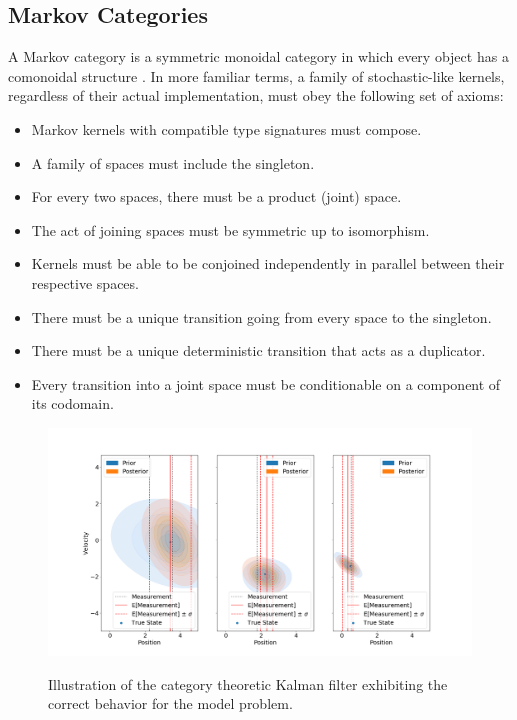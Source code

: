 \documentclass[letterpaper, 10 pt, conference]{ieeeconf}  %
\begin{document}
\subsection{Markov Categories}
A Markov category is a symmetric monoidal category in which every object has a comonoidal structure \cite{fritz}.
In more familiar terms, a family of stochastic-like kernels, regardless of their actual implementation, must obey the following set of axioms:

\begin{itemize}
    \item Markov kernels with compatible type signatures must compose.
    \item A family of spaces must include the singleton.
    \item For every two spaces, there must be a product (joint) space.
    \item The act of joining spaces must be symmetric up to isomorphism.
    \item Kernels must be able to be conjoined independently in parallel between their respective spaces.
    \item There must be a unique transition going from every space to the singleton.
    \item There must be a unique deterministic transition that acts as a duplicator.
    \item Every transition into a joint space must be conditionable on a component of its codomain.
\end{itemize}

\begin{figure}[h]
    \centering
    \includegraphics[width=\linewidth]{simulation_results.png}
    \label{simulation-results}
    \caption{Illustration of the category theoretic Kalman filter exhibiting the correct behavior for the model problem.}
\end{figure}
\end{document}

